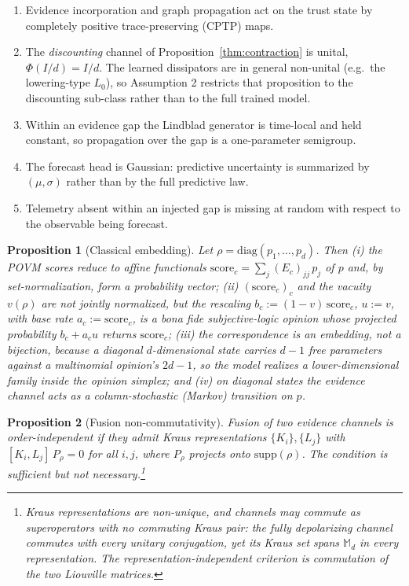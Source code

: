 \documentclass[journal]{IEEEtran}
\newtheorem{proposition}{Proposition}
\begin{document}
\begin{enumerate}
\item[1)] Evidence incorporation and graph propagation act on the trust state by
  completely positive trace-preserving (CPTP) maps.
\item[2)] The \emph{discounting} channel of
  Proposition~\ref{thm:contraction} is unital, $\Phi(I/d)=I/d$. The learned
  dissipators are in general non-unital (e.g.\ the lowering-type $L_0$), so Assumption 2
  restricts that proposition to the discounting sub-class rather than to the full
  trained model.
\item[3)] Within an evidence gap the Lindblad generator is time-local and held
  constant, so propagation over the gap is a one-parameter semigroup.
\item[4)] The forecast head is Gaussian: predictive uncertainty is summarized by
  $(\mu,\sigma)$ rather than by the full predictive law.
\item[5)] Telemetry absent within an injected gap is missing at random with respect
  to the observable being forecast.
\end{enumerate}

\begin{proposition}[Classical embedding]\label{thm:recovery}
Let $\rho=\mathrm{diag}(p_1,\dots,p_d)$. Then (i) the POVM scores reduce to affine
functionals $\mathrm{score}_c=\sum_j (E_c)_{jj}\,p_j$ of $p$ and, by
set-normalization, form a probability vector; (ii) $(\mathrm{score}_c)_c$ and the
vacuity $v(\rho)$ are \emph{not} jointly normalized, but the rescaling
$b_c := (1-v)\,\mathrm{score}_c$, $u := v$, with base rate $a_c := \mathrm{score}_c$,
is a bona fide subjective-logic opinion \cite{josang2001logic} whose projected
probability $b_c + a_c u$ returns $\mathrm{score}_c$; (iii) the correspondence is an
\emph{embedding}, not a bijection, because a diagonal $d$-dimensional state carries $d-1$
free parameters against a multinomial opinion's $2d-1$, so the model realizes a
lower-dimensional family inside the opinion simplex; and (iv) on diagonal states the
evidence channel acts as a column-stochastic (Markov) transition on $p$.
\end{proposition}

\begin{proposition}[Fusion non-commutativity]\label{thm:fusion}
Fusion of two evidence channels is order-independent \emph{if} they admit Kraus
representations $\{K_i\},\{L_j\}$ with $[K_i,L_j]\,P_\rho = 0$ for all $i,j$, where
$P_\rho$ projects onto $\mathrm{supp}(\rho)$. The condition is sufficient but not
necessary.\footnote{Kraus representations are non-unique, and channels may commute as
superoperators with no commuting Kraus pair: the fully depolarizing channel commutes
with every unitary conjugation, yet its Kraus set spans $\mathbb{M}_d$ in every
representation. The representation-independent criterion is commutation of the two
Liouville matrices.}
\end{proposition}
\end{document}
